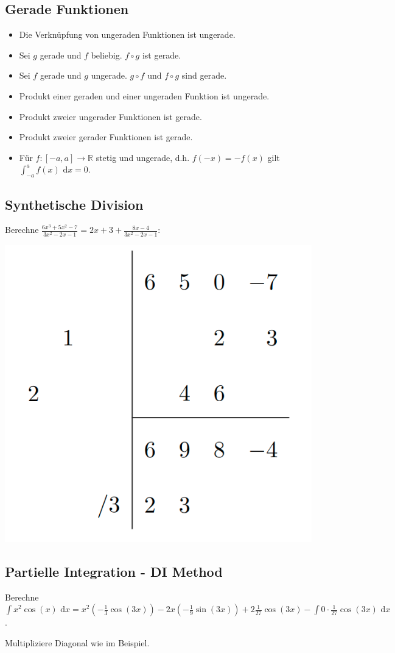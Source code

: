 \documentclass[a4paper,10pt]{article}
\def\dx{\text{ d}x}
\begin{document}
\subsection{Gerade Funktionen}
\begin{itemize}
  \item Die Verknüpfung von ungeraden Funktionen ist ungerade. 
  \item Sei $g$ gerade und $f$ beliebig. $f \circ g$ ist gerade.
  \item Sei $f$ gerade und $g$ ungerade. $g \circ f$ und $f \circ g$ sind gerade.
  \item Produkt einer geraden und einer ungeraden Funktion ist ungerade.
  \item Produkt zweier ungerader Funktionen ist gerade.
  \item Produkt zweier gerader Funktionen ist gerade.
  \item Für $f: [-a, a] \to \mathbb{R}$ stetig und ungerade, d.h. $f(-x) = -f(x)$ gilt $\int_{-a}^a f(x) \dx = 0$.
\end{itemize}

\subsection{Synthetische Division}
Berechne $\frac{6x^3 + 5x^2 - 7}{3x^2 - 2x - 1} = 2x + 3 + \frac{8x - 4}{3x^2 -2x - 1}$:\\
\begin{center}
  \includegraphics[width=0.4 \linewidth]{synthetic-division.png}
\end{center}

\subsection{Partielle Integration - DI Method}
Berechne $\int x^2 \cos(x) \dx = x^2 (-\frac{1}{3}\cos(3x)) - 2x(-\frac{1}{9}\sin(3x)) + 2\frac{1}{27}\cos(3x) - \int 0 \cdot \frac{1}{27} \cos(3x) \dx$.

Multipliziere Diagonal wie im Beispiel.
\end{document}
